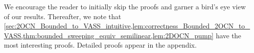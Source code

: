 \documentclass[USenglish]{lipics-v2021}
\newcommand{\shtodo}[1]{\todo[color=cyan!25,size=\small]{SH: #1}}
\begin{document}
	
	We encourage the reader to initially skip the proofs and garner a bird's eye view of our results. 
	Thereafter, we note that
	\cref{sec:2OCN_Bounded_to_VASS_intuitive,lem:correctness_Bounded_2OCN_to_VASS,thm:bounded_sweeping_equiv_semilinear,lem:2DOCN_pump}
	have the most interesting proofs. Detailed proofs appear in the appendix.
	
	
	
	
	
\end{document}
